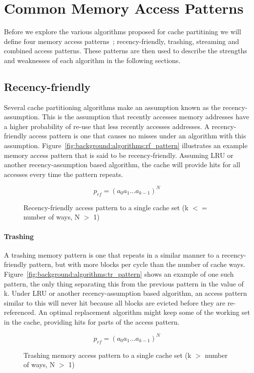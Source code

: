 \section{Common Memory Access Patterns}
Before we explore the various algorithms proposed for cache partitining we will define four memory access patterns~\cite{Jaleel2010}; recency-friendly, trashing, streaming and combined access patterns.
These patterns are then used to describe the strengths and weaknesses of each algorithm in the following sections.

\subsection{Recency-friendly}
Several cache partitioning algorithms make an assumption known as the recency-assumption.
This is the assumption that recently accesses memory addresses have a higher probability of re-use that less recently accesses addresses.
A recency-friendly access pattern is one that causes no misses under an algorithm with this assumption.
Figure~\ref{fig:background:algorithms:rf_pattern} illustrates an example memory access pattern that is said to be recency-friendly.
Assuming LRU or another recency-assumption based algorithm, the cache will provide hits for all accesses every time the pattern repeats.

\begin{figure}[ht]
\centering
\begin{equation} \label{fig:background:algorithms:rf_pattern}
p_{rf} = (a_0 a_1 ... a_{k-1})^N
\end{equation}
\caption{Recency-friendly access pattern to a single cache set (k $<=$ number of ways, N $>$ 1)}
\end{figure}

\paragraph{Trashing}
A trashing memory pattern is one that repeats in a similar manner to a recency-friendly pattern, but with more blocks per cycle than the number of cache ways. 
Figure~\ref{fig:background:algorithms:tr_pattern} shows an example of one such pattern, the only thing separating this from the previous pattern in the value of k.
Under LRU or another recency-assumption based algorithm, an access pattern similar to this will never hit because all blocks are evicted before they are re-referenced.
An optimal replacement algorithm might keep some of the working set in the cache, providing hits for parts of the access pattern.
\begin{figure}[ht]
\centering
\begin{equation} \label{fig:background:algorithms:tr_pattern}
p_{rf} = (a_0 a_1 ... a_{k-1})^N
\end{equation}
\caption{Trashing memory access pattern to a single cache set (k $>$ number of ways, N $>$ 1)}
\end{figure}


